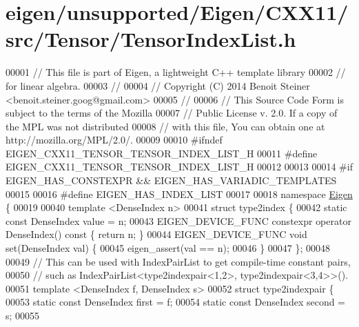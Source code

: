 \hypertarget{eigen_2unsupported_2_eigen_2_c_x_x11_2src_2_tensor_2_tensor_index_list_8h_source}{}\section{eigen/unsupported/\+Eigen/\+C\+X\+X11/src/\+Tensor/\+Tensor\+Index\+List.h}
\label{eigen_2unsupported_2_eigen_2_c_x_x11_2src_2_tensor_2_tensor_index_list_8h_source}

\begin{DoxyCode}
00001 \textcolor{comment}{// This file is part of Eigen, a lightweight C++ template library}
00002 \textcolor{comment}{// for linear algebra.}
00003 \textcolor{comment}{//}
00004 \textcolor{comment}{// Copyright (C) 2014 Benoit Steiner <benoit.steiner.goog@gmail.com>}
00005 \textcolor{comment}{//}
00006 \textcolor{comment}{// This Source Code Form is subject to the terms of the Mozilla}
00007 \textcolor{comment}{// Public License v. 2.0. If a copy of the MPL was not distributed}
00008 \textcolor{comment}{// with this file, You can obtain one at http://mozilla.org/MPL/2.0/.}
00009 
00010 \textcolor{preprocessor}{#ifndef EIGEN\_CXX11\_TENSOR\_TENSOR\_INDEX\_LIST\_H}
00011 \textcolor{preprocessor}{#define EIGEN\_CXX11\_TENSOR\_TENSOR\_INDEX\_LIST\_H}
00012 
00013 
00014 \textcolor{preprocessor}{#if EIGEN\_HAS\_CONSTEXPR && EIGEN\_HAS\_VARIADIC\_TEMPLATES}
00015 
00016 \textcolor{preprocessor}{#define EIGEN\_HAS\_INDEX\_LIST}
00017 
00018 \textcolor{keyword}{namespace }\hyperlink{namespace_eigen}{Eigen} \{
00019 
00040 \textcolor{keyword}{template} <DenseIndex n>
00041 \textcolor{keyword}{struct }type2index \{
00042   \textcolor{keyword}{static} \textcolor{keyword}{const} DenseIndex value = n;
00043   EIGEN\_DEVICE\_FUNC constexpr \textcolor{keyword}{operator} DenseIndex()\textcolor{keyword}{ const }\{ \textcolor{keywordflow}{return} n; \}
00044   EIGEN\_DEVICE\_FUNC \textcolor{keywordtype}{void} \textcolor{keyword}{set}(DenseIndex val) \{
00045     eigen\_assert(val == n);
00046   \}
00047 \};
00048 
00049 \textcolor{comment}{// This can be used with IndexPairList to get compile-time constant pairs,}
00050 \textcolor{comment}{// such as IndexPairList<type2indexpair<1,2>, type2indexpair<3,4>>().}
00051 \textcolor{keyword}{template} <DenseIndex f, DenseIndex s>
00052 \textcolor{keyword}{struct }type2indexpair \{
00053   \textcolor{keyword}{static} \textcolor{keyword}{const} DenseIndex first = f;
00054   \textcolor{keyword}{static} \textcolor{keyword}{const} DenseIndex second = s;
00055 

\end{DoxyCode}
